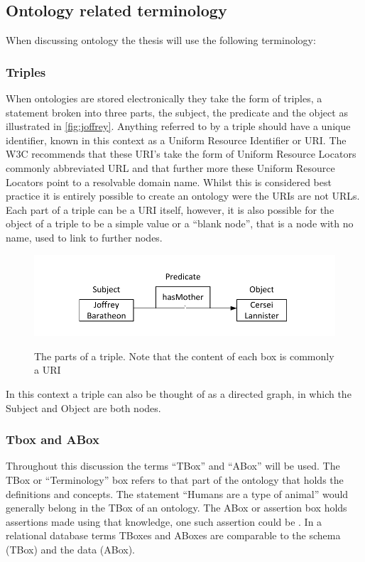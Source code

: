 \subsection{Ontology related terminology}

When discussing ontology the thesis will use the following terminology:

\subsubsection{Triples}\label{sec:trip}
When ontologies are stored electronically they take the form of triples, a statement broken into three parts, the subject, the predicate and the object as illustrated in \autoref{fig:joffrey}. Anything referred to by a triple should have a unique identifier, known in this context as a Uniform Resource Identifier or URI. The W3C recommends that these URI's take the form of Uniform Resource Locators commonly abbreviated URL and that further more these Uniform Resource Locators point to a resolvable domain name. Whilst this is considered best practice it is entirely possible to create an ontology were the URIs are not URLs. Each part of a triple can be a URI itself, however, it is also possible for the object of a triple to be a simple value or a ``blank node'', that is a node with no name, used to link to further nodes.
\begin{figure}[hb]
    \myfloatalign
    {\includegraphics[width=\linewidth,keepaspectratio]{gfx/JofferyTriple}} 
    \caption[Triple]{The parts of a triple. Note that the content of each box is commonly a URI}
    \label{fig:joffrey}
\end{figure}
In this context a triple can also be thought of as a directed graph, in which the Subject and Object are both nodes.

\subsubsection{Tbox and ABox}
Throughout this discussion the terms ``TBox'' and ``ABox'' will be used. The TBox or ``Terminology'' box refers to that part of the ontology that holds the definitions and concepts. The statement ``Humans are a type of animal'' would generally belong in the TBox of an ontology. The ABox or assertion box holds assertions made using that knowledge, one such assertion could be . In a relational database terms TBoxes and ABoxes are comparable to the schema (TBox) and the data (ABox).

